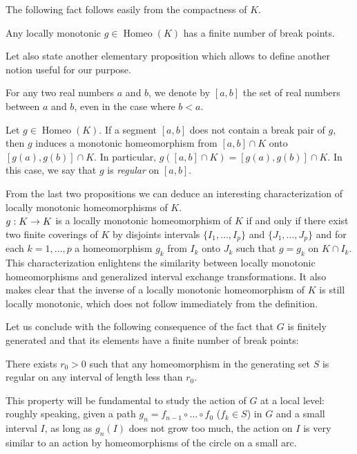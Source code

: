 \documentclass[AHL,Unicode,longabstracts,published]{cedram}
\DeclareMathOperator{\Homeo}{Homeo}
\newcounter{setofcase}
\newcounter{case}[setofcase]
\renewcommand*{\to}{\mathchoice{\longrightarrow}{\rightarrow}{\rightarrow}{\rightarrow}}
\begin{document}
The following fact follows easily from the compactness of $K$.

\begin{prop}\label{finite}
Any locally monotonic $g\in \Homeo(K)$ has a finite number of break points.
\end{prop}

Let also state another elementary proposition which allows to define another notion useful for our purpose.

For any two real numbers $a$ and $b$, we denote by $[a,b]$ the set of real numbers between $a$ and $b$, even in the case where $b<a$.

\begin{prop}\label{regularsegment}
Let $g\in \Homeo(K)$. If a segment $[a,b]$ does not contain a break pair of $g$, then $g$ induces a monotonic homeomorphism from $[a,b]\cap K$ onto $[g(a),g(b)]\cap K$. In particular, $g([a,b]\cap K)=[g(a),g(b)]\cap K$. In this case, we say that $g$ is \emph{regular} on $[a,b]$.
\end{prop}

\begin{rema}
From the last two propositions we can deduce an interesting characterization of locally monotonic homeomorphisms of $K$.\\
$g:K\to K$ is a locally monotonic homeomorphism of $K$ if and only if there exist two finite coverings of $K$ by disjoints intervals $\{I_1,\dots,I_p\}$ and $\{J_1,\dots, J_p\}$ and for each $k=1,\dots,p$ a homeomorphism $g_k$ from $I_k$ onto $J_k$ such that $g=g_k$ on $K\cap I_k$.\\
This characterization enlightens the similarity between locally monotonic homeomorphisms and generalized interval exchange transformations. It also makes clear that the inverse of a locally monotonic homeomorphism of $K$ is still locally monotonic, which does not follow immediately from the definition.
\end{rema}

Let us conclude with the following consequence of the fact that $G$ is finitely generated and that its elements have a finite number of break points:

\begin{lemm}\label{monotonic}
There exists $r_0>0$ such that any homeomorphism in the generating set $S$ is regular on any interval of length less than $r_0$.
\end{lemm}

This property will be fundamental to study the action of $G$ at a local level: roughly speaking, given a path $g_n=f_{n-1}\circ\dots \circ f_0$ ($f_k\in S$) in $G$ and a small interval $I$, as long as $g_n(I)$ does not grow too much, the action on $I$ is very similar to an action by homeomorphisms of the circle on a small arc.
\end{document}
